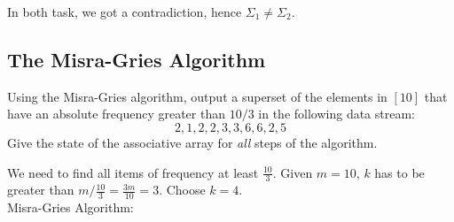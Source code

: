 \documentclass{article}
\begin{document}
  In both task, we got a contradiction, hence $\Sigma_1\neq\Sigma_2$.

  \subsection{The Misra-Gries Algorithm}
  \begin{centerframebox}
    Using the Misra-Gries algorithm, output a superset of the elements in $[10]$ that
    have an absolute frequency greater than $10/3$ in the following data stream:
    \[ 2, 1, 2, 2, 3, 3, 6, 6, 2, 5 \]
    Give the state of the associative array for \textit{all} steps of the algorithm.
  \end{centerframebox}
  We need to find all items of frequency at least $\frac{10}{3}$. Given $m=10$, $k$ has to be greater than ${m}/{\frac{10}{3}}=\frac{3m}{10}=3$. Choose $k=4$.
  \\Misra-Gries Algorithm:
\end{document}
